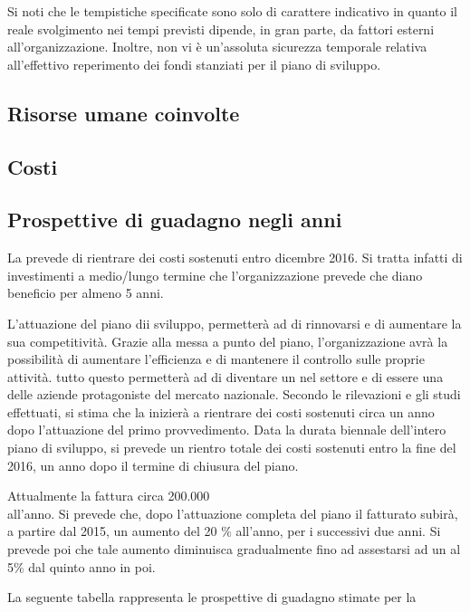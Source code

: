  Si noti che le tempistiche specificate sono solo di carattere indicativo in quanto il reale svolgimento nei tempi previsti dipende, in gran parte, da fattori esterni all'organizzazione. Inoltre, non vi è un'assoluta sicurezza temporale relativa all'effettivo reperimento dei fondi stanziati per il piano di sviluppo.

\subsection{Risorse umane coinvolte}
\subsection{Costi}
\subsection{ Prospettive di guadagno negli anni}
La \customer prevede di rientrare dei costi sostenuti entro dicembre 2016. Si tratta infatti di investimenti a medio/lungo termine che l'organizzazione prevede che diano beneficio per almeno 5 anni.

L'attuazione del piano dii sviluppo, permetterà ad  \customer di rinnovarsi e di aumentare la sua competitività. Grazie alla messa a punto del piano, l'organizzazione avrà la possibilità di aumentare l'efficienza e di mantenere il controllo sulle proprie attività. tutto questo permetterà ad \customer di diventare un  nel settore e di essere una delle aziende protagoniste del mercato nazionale. 
Secondo le rilevazioni e gli studi effettuati, si stima che la \customer inizierà a rientrare dei costi sostenuti circa un anno dopo l'attuazione del primo provvedimento. Data la durata biennale dell'intero piano di sviluppo, si prevede un rientro totale dei costi sostenuti entro la fine del 2016, un anno dopo il termine di chiusura del piano.

Attualmente la \customer fattura circa 200.000 \text{\euro} \\ all'anno. Si prevede che, dopo l'attuazione completa del piano il fatturato subirà, a partire dal 2015, un aumento del 20 \% all'anno, per i successivi due anni. Si prevede poi che tale aumento diminuisca gradualmente fino ad assestarsi ad un al 5\% dal quinto anno in poi.
 
La seguente tabella rappresenta le prospettive di guadagno stimate per la \customer

